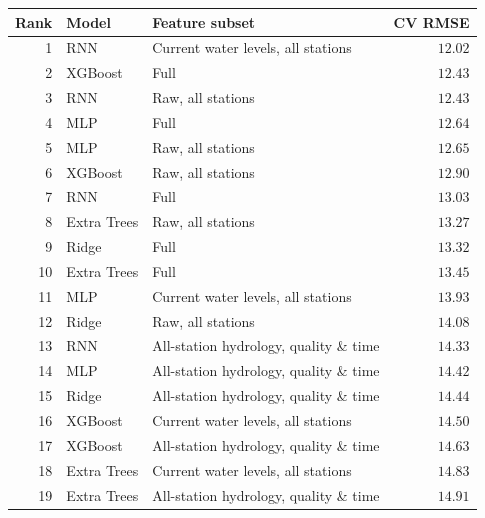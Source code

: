 \begin{tabularx}{\textwidth}{@{}rlXr@{}}
\toprule
\textbf{Rank} & \textbf{Model} & \textbf{Feature subset} & \textbf{CV RMSE} \\
\midrule
1 & RNN & Current water levels, all stations & $12.02$ \\
2 & XGBoost & Full & $12.43$ \\
3 & RNN & Raw, all stations & $12.43$ \\
4 & MLP & Full & $12.64$ \\
5 & MLP & Raw, all stations & $12.65$ \\
6 & XGBoost & Raw, all stations & $12.90$ \\
7 & RNN & Full & $13.03$ \\
8 & Extra Trees & Raw, all stations & $13.27$ \\
9 & Ridge & Full & $13.32$ \\
10 & Extra Trees & Full & $13.45$ \\
11 & MLP & Current water levels, all stations & $13.93$ \\
12 & Ridge & Raw, all stations & $14.08$ \\
13 & RNN & All-station hydrology, quality \& time & $14.33$ \\
14 & MLP & All-station hydrology, quality \& time & $14.42$ \\
15 & Ridge & All-station hydrology, quality \& time & $14.44$ \\
16 & XGBoost & Current water levels, all stations & $14.50$ \\
17 & XGBoost & All-station hydrology, quality \& time & $14.63$ \\
18 & Extra Trees & Current water levels, all stations & $14.83$ \\
19 & Extra Trees & All-station hydrology, quality \& time & $14.91$ \\
\bottomrule
\end{tabularx}

